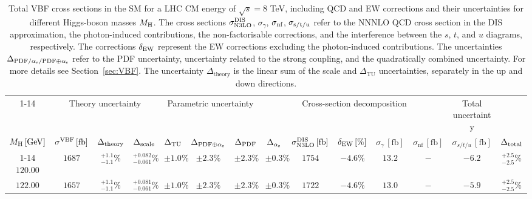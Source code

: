 \begin{landscape}
\begin{table}[ht!]
\caption{Total VBF cross sections in the SM for a LHC CM energy of $\sqrt{s}=8$ TeV, including QCD and EW corrections
and their uncertainties for different Higgs-boson masses \texorpdfstring{$M_\mathrm{H}$}\MH. 
The cross sections $\sigma_{\mathrm{N3LO}}^{\mathrm{DIS}}$, $\sigma_{\gamma}$, $\sigma_{\mbox{\scriptsize nf}}$, $\sigma_{\mbox{\scriptsize s/t/u}}$ refer to the NNNLO QCD cross section in the DIS approximation, the photon-induced contributions, the non-factorisable corrections, and the interference between the $s$, $t$, and $u$ diagrams, respectively.
The corrections $\delta_{\mathrm{EW}}$ represent the EW corrections excluding the photon-induced contributions.
The uncertainties $\Delta_{\mathrm{PDF}/\alpha_{\mathrm{s}}/\mathrm{PDF\oplus\alpha_{\mathrm{s}}}}$ refer to the PDF uncertainty, uncertainty related to the strong coupling, and the quadratically combined uncertainty.
For more details see Section~\ref{sec:VBF}. The uncertainty $\Delta_{\mathrm{theory}}$ is the linear sum of the scale and $\Delta_{\mathrm{TU}}$ uncertainties, separately in the up and down directions.}
\label{tab:vbf_XStot_8}
\centering
\scriptsize
{\renewcommand{\arraystretch}{1.4}
\begin{tabular}{| cc | ccc | ccc | ccc | cc | c |}
\cline{1-14}
\multicolumn{2}{|c|}{\(\sqrt{s} = 8\,\mathrm{TeV}\)} &
\multicolumn{3}{|c|}{Theory uncertainty} &
\multicolumn{3}{|c|}{Parametric uncertainty} &
\multicolumn{5}{|c|}{Cross-section decomposition} &
\multicolumn{1}{c|}{Total uncertainty} \\
\(M_\mathrm{H}\,[\mathrm{GeV}]\) & \(\sigma^{\mathrm{VBF}}\,[\mathrm{fb}]\) &
\(\Delta_{\rm theory}\) &
{\color{black!55}\(\Delta_{\rm scale}\)} & {\color{black!55}\(\Delta_{\rm TU}\)} &
\(\Delta_{\rm PDF\oplus\alpha_{\mathrm{s}}}\) &
{\color{black!55}\(\Delta_{\rm PDF}\)} & {\color{black!55}\(\Delta_{\alpha_{\mathrm{s}}}\)} &
\(\sigma_{\mathrm{N3LO}}^{\mathrm{DIS}}\,[\mathrm{fb}]\) & \(\delta_{\mathrm{EW}}\,[\%]\) & \(\sigma_\gamma\,[\mathrm{fb}]\) & \(\sigma_{\mathrm{nf}}\,[\mathrm{fb}]\) & \(\sigma_{s/t/u}\,[\mathrm{fb}]\) &
\(\Delta_{\rm total}\)
\\
\cline{1-14}
$120.00$ & $1687$ & $^{+1.1}_{-1.1}\%$ & {\color{black!55}$^{+0.082}_{-0.061}\%$} & {\color{black!55}$\pm 1.0\%$} & $\pm 2.3\%$ & {\color{black!55}$\pm 2.3\%$} & {\color{black!55}$\pm 0.3\%$} & $1754$ & $-4.6\%$ & $13.2$ & $-$ & $-6.2$ & $^{+2.5}_{-2.5}\%$ \\
$122.00$ & $1657$ & $^{+1.1}_{-1.1}\%$ & {\color{black!55}$^{+0.081}_{-0.061}\%$} & {\color{black!55}$\pm 1.0\%$} & $\pm 2.3\%$ & {\color{black!55}$\pm 2.3\%$} & {\color{black!55}$\pm 0.3\%$} & $1722$ & $-4.6\%$ & $13.0$ & $-$ & $-5.9$ & $^{+2.5}_{-2.5}\%$ \\

\end{tabular}}
\end{table}
\end{landscape}
